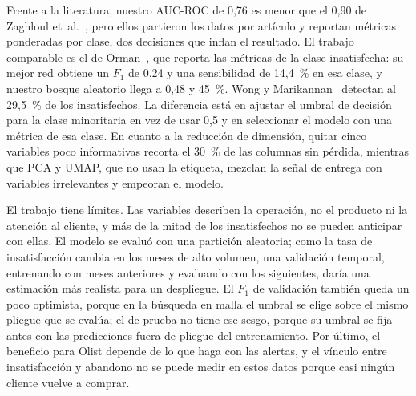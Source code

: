 \documentclass[journal]{IEEEtran}
\begin{document}
Frente a la literatura, nuestro AUC-ROC de 0,76 es menor que el 0,90 de Zaghloul et~al.~\cite{zaghloul2024}, pero ellos partieron los datos por artículo y reportan métricas ponderadas por clase, dos decisiones que inflan el resultado. El trabajo comparable es el de Orman~\cite{orman2026}, que reporta las métricas de la clase insatisfecha: su mejor red obtiene un $F_1$ de 0,24 y una sensibilidad de 14,4~\% en esa clase, y nuestro bosque aleatorio llega a 0,48 y 45~\%. Wong y Marikannan~\cite{wong2020} detectan al 29,5~\% de los insatisfechos. La diferencia está en ajustar el umbral de decisión para la clase minoritaria en vez de usar 0,5 y en seleccionar el modelo con una métrica de esa clase. En cuanto a la reducción de dimensión, quitar cinco variables poco informativas recorta el 30~\% de las columnas sin pérdida, mientras que PCA y UMAP, que no usan la etiqueta, mezclan la señal de entrega con variables irrelevantes y empeoran el modelo.

El trabajo tiene límites. Las variables describen la operación, no el producto ni la atención al cliente, y más de la mitad de los insatisfechos no se pueden anticipar con ellas. El modelo se evaluó con una partición aleatoria; como la tasa de insatisfacción cambia en los meses de alto volumen, una validación temporal, entrenando con meses anteriores y evaluando con los siguientes, daría una estimación más realista para un despliegue. El $F_1$ de validación también queda un poco optimista, porque en la búsqueda en malla el umbral se elige sobre el mismo pliegue que se evalúa; el de prueba no tiene ese sesgo, porque su umbral se fija antes con las predicciones fuera de pliegue del entrenamiento. Por último, el beneficio para Olist depende de lo que haga con las alertas, y el vínculo entre insatisfacción y abandono no se puede medir en estos datos porque casi ningún cliente vuelve a comprar.



\end{document}
